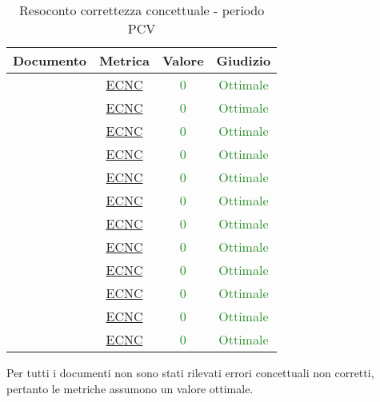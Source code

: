 							\begin{table}[H]
								\centering
								\small
								\begin{tabular}{c | c | c | c}
									\hline
									\textbf{Documento} & \textbf{Metrica}    & \textbf{Valore} & \textbf{Giudizio} \\ \hline
									\pdpvtre        & \hyperref[MLEC]{ECNC}  & \textcolor{ForestGreen}{0} & \textcolor{ForestGreen}{Ottimale} \\
									\pdqvtre        & \hyperref[MLEC]{ECNC} &  \textcolor{ForestGreen}{0} & \textcolor{ForestGreen}{Ottimale} \\
									\ndpvtre        & \hyperref[MLEC]{ECNC}  & \textcolor{ForestGreen}{0} & \textcolor{ForestGreen}{Ottimale} \\
									\adrvtre        & \hyperref[MLEC]{ECNC}   & \textcolor{ForestGreen}{0} & \textcolor{ForestGreen}{Ottimale} \\
									\stvdue		& \hyperref[MLEC]{ECNC}  & \textcolor{ForestGreen}{0} & \textcolor{ForestGreen}{Ottimale} \\
									\glvdue        & \hyperref[MLEC]{ECNC}  & \textcolor{ForestGreen}{0} & \textcolor{ForestGreen}{Ottimale} \\
									\ddpvuno        & \hyperref[MLEC]{ECNC}  & \textcolor{ForestGreen}{0} & \textcolor{ForestGreen}{Ottimale} \\
									\manutvuno        & \hyperref[MLEC]{ECNC}  & \textcolor{ForestGreen}{0} & \textcolor{ForestGreen}{Ottimale} \\
									\manmanvuno        & \hyperref[MLEC]{ECNC}  & \textcolor{ForestGreen}{0} & \textcolor{ForestGreen}{Ottimale} \\
									\vsesettei       & \hyperref[MLEC]{ECNC} & \textcolor{ForestGreen}{0} & \textcolor{ForestGreen}{Ottimale} \\
									\vottoi       & \hyperref[MLEC]{ECNC}  & \textcolor{ForestGreen}{0} & \textcolor{ForestGreen}{Ottimale} \\
									\vquattroe       & \hyperref[MLEC]{ECNC} & \textcolor{ForestGreen}{0} & \textcolor{ForestGreen}{Ottimale} \\
								\end{tabular}
								\caption{Resoconto correttezza concettuale - periodo PCV}
								\label{tab_resoconto_correttezza_concettuale_PPCV}
							\end{table}
							
							Per tutti i documenti non sono stati rilevati errori concettuali non corretti, pertanto le metriche assumono un valore ottimale.
							
